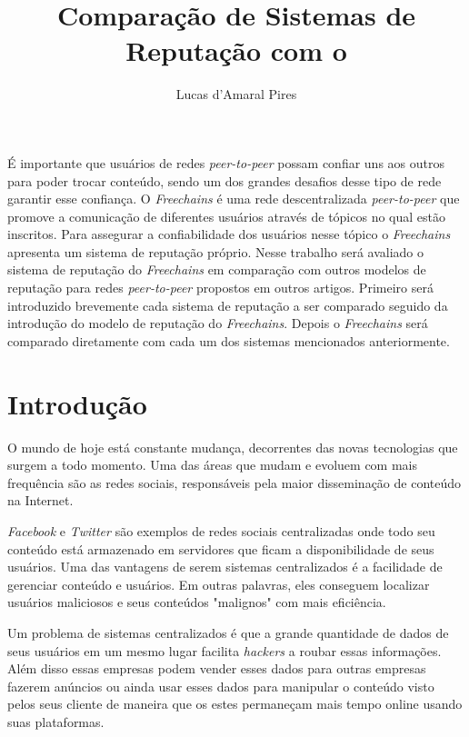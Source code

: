 \documentclass[12pt]{article}
\title{Comparação de Sistemas de Reputação com o \FC}
\author{Lucas d'Amaral Pires\inst{1}}
\newcommand{\FC} {\emph{Freechains}\xspace}
\newcommand{\PtoP} {\emph{peer-to-peer}\xspace}
\begin{document}
 

\maketitle

\begin{resumo} 

É importante que usuários de redes \PtoP possam confiar uns aos outros para poder trocar conteúdo, sendo um dos grandes desafios desse tipo de rede garantir esse confiança. O \FC é uma rede descentralizada \PtoP que promove a comunicação de diferentes usuários através de tópicos no qual estão inscritos. Para assegurar a confiabilidade dos usuários nesse tópico o \FC apresenta um sistema de reputação próprio. Nesse trabalho será avaliado o sistema de reputação do \FC em comparação com outros modelos de reputação para redes \PtoP propostos em outros artigos. Primeiro será introduzido brevemente cada sistema de reputação a ser comparado seguido da introdução do modelo de reputação do \FC. Depois o \FC será comparado diretamente com cada um dos sistemas mencionados anteriormente.
  
\end{resumo}


\section{Introdução} \label{sec:intro}

O mundo de hoje está constante mudança, decorrentes das novas tecnologias que surgem a todo momento. Uma das áreas que mudam e evoluem com mais frequência são as redes sociais, responsáveis pela maior disseminação de conteúdo na Internet.

\emph{Facebook} e \emph{Twitter} são exemplos de redes sociais centralizadas onde todo seu conteúdo está armazenado em servidores que ficam a disponibilidade de seus usuários. Uma das vantagens de serem sistemas centralizados é a facilidade de gerenciar conteúdo e usuários. Em outras palavras, eles conseguem localizar usuários maliciosos e seus conteúdos "malignos" com mais eficiência.

Um problema de sistemas centralizados é que a grande quantidade de dados de seus usuários em um mesmo lugar facilita \emph{hackers} a roubar essas informações. Além disso essas empresas podem vender esses dados para outras empresas fazerem anúncios ou ainda usar esses dados para manipular o conteúdo visto pelos seus cliente de maneira que os estes permaneçam mais tempo online usando suas plataformas.
\end{document}
